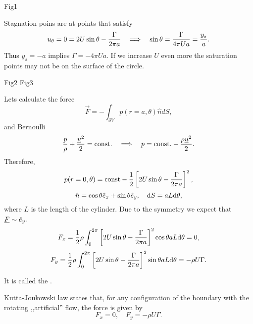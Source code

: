 \documentclass[../main.tex]{subfiles}
\begin{document}
  \todo Fig1
  
  Stagnation poins are at points that satisfy
  \begin{displaymath}
    u_\theta = 0 = 2 U \sin \theta - \frac{\Gamma}{2 \pi a} \quad \Longrightarrow \quad \sin \theta = \frac{\Gamma}{4\pi U a} = \frac{y_s}{a}.
  \end{displaymath}
  Thus $y_s = - a $ implies $\Gamma = - 4 \pi U a$.
  If we increase $U$ even more the saturation points may not be on the surface of the circle.
  
  \todo Fig2 
  \todo Fig3
  
  Lets calculate the force 
  \begin{displaymath}
    \vec F = - \int_{\partial V} p(r = a, \theta) \hat n d S, 
  \end{displaymath}
  and Bernoulli
  \begin{displaymath}
    \frac{p}{\rho} + \frac{\underline{u} ^2 }{2} = \textrm{const}. \quad \Longrightarrow \quad p = \textrm{const}. - \frac{\rho \underline{u}^2}{2}.
  \end{displaymath}
  Therefore, 
  \begin{displaymath}
    p(r = 0, \theta) = \textrm{const} - \frac{1}{2}\left[ 2 U \sin \theta - \frac{\Gamma}{2 \pi a} \right]^2,
  \end{displaymath}
  \begin{displaymath}
    \hat n = \cos \theta \hat{e}_x + \sin \theta \hat{e}_y, \quad \mathrm{d} S = aL \mathrm{d} \theta ,
  \end{displaymath}
  where $L$ is the length of the cylinder.
  Due to the symmetry we expect that $ \underline{F} \sim \hat{e}_y$.
  \begin{displaymath}
    F_x = \frac{1}{2} \rho \int_0^{2 \pi} \left[ 2 U\sin \theta - \frac{\Gamma}{2\pi a} \right]^2 \cos \theta aL\mathrm{d} \theta = 0,
  \end{displaymath}
  \begin{displaymath}
    F_y =  \frac{1}{2} \rho \int_0^{2 \pi} \left[ 2 U\sin \theta - \frac{\Gamma}{2\pi a} \right]^2 \sin \theta aL\mathrm{d} \theta = - \rho U \Gamma.
  \end{displaymath}
  
  It is called the .
  
  Kutta-Joukowski law states that, for any configuration of the boundary with the rotating ,,artificial'' flow, the force is given by
  \begin{displaymath}
    F_x = 0, \quad F_y = - \rho U \Gamma.
  \end{displaymath}
  
  
\end{document}
